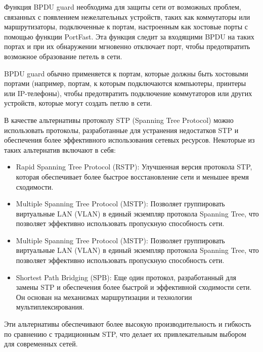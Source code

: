 Функция BPDU guard необходима для защиты сети от возможных
проблем, связанных с появлением нежелательных устройств, таких как
коммутаторы или маршрутизаторы, подключенные к портам,
настроенным как хостовые порты с помощью функции PortFast. Эта
функция следит за входящими BPDU на таких портах и при их
обнаружении мгновенно отключает порт, чтобы предотвратить возможное
образование петель в сети.

BPDU guard обычно применяется к портам, которые должны быть
хостовыми портами (например, портам, к которым подключаются
компьютеры, принтеры или IP-телефоны), чтобы предотвратить
подключение коммутаторов или других устройств, которые могут создать
петлю в сети.

В качестве альтернативы протоколу STP (Spanning Tree Protocol) можно
использовать протоколы, разработанные для устранения недостатков STP
и обеспечения более эффективного использования сетевых ресурсов.
Некоторые из таких альтернатив включают в себя:

\begin{itemize}
    \item Rapid Spanning Tree Protocol (RSTP): Улучшенная версия протокола
    STP, которая обеспечивает более быстрое восстановление сети и
    меньшее время сходимости.
    \item Multiple Spanning Tree Protocol (MSTP): Позволяет группировать
    виртуальные LAN (VLAN) в единый экземпляр протокола Spanning
    Tree, что позволяет эффективно использовать пропускную
    способность сети.
    \item Multiple Spanning Tree Protocol (MSTP): Позволяет группировать
    виртуальные LAN (VLAN) в единый экземпляр протокола Spanning
    Tree, что позволяет эффективно использовать пропускную
    способность сети.
    \item Shortest Path Bridging (SPB): Еще один протокол, разработанный для
    замены STP и обеспечения более быстрой и эффективной
    сходимости сети. Он основан на механизмах маршрутизации и
    технологии мультиплексирования.
\end{itemize}

Эти альтернативы обеспечивают более высокую производительность и
гибкость по сравнению с традиционным STP, что делает их
привлекательным выбором для современных сетей.